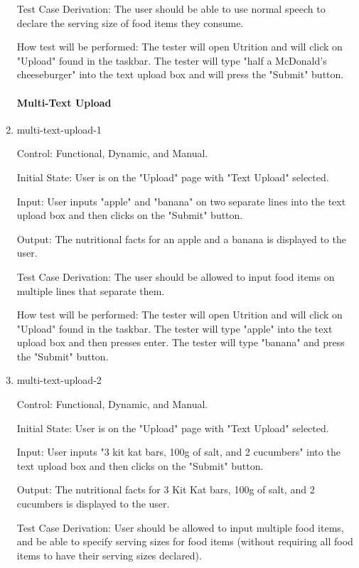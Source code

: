 \documentclass[12pt, titlepage]{article}
\begin{document}
\begin{enumerate}
	Test Case Derivation: The user should be able to use normal speech to declare the serving size of food items they consume.
	
	How test will be performed: The tester will open Utrition and will click on "Upload" found in the taskbar. The tester will type "half a McDonald's cheeseburger" into the text upload box and will press the "Submit" button.
	
	\paragraph{Multi-Text Upload}
	
	\item{multi-text-upload-1\\}
	
	Control: Functional, Dynamic, and Manual.
	
	Initial State: User is on the "Upload" page with "Text Upload" selected.
	
	Input: User inputs "apple" and "banana" on two separate lines into the text upload box and then clicks on the "Submit" button.
	
	Output: The nutritional facts for an apple and a banana is displayed to the user.
	
	Test Case Derivation: The user should be allowed to input food items on multiple lines that separate them.
	
	How test will be performed: The tester will open Utrition and will click on "Upload" found in the taskbar. The tester will type "apple" into the text upload box and then presses enter. The tester will type "banana" and press the "Submit" button.
	
	\item{multi-text-upload-2\\}
	
	Control: Functional, Dynamic, and Manual.
	
	Initial State: User is on the "Upload" page with "Text Upload" selected.
	
	Input: User inputs "3 kit kat bars, 100g of salt, and 2 cucumbers" into the text upload box and then clicks on the "Submit" button.
	
	Output: The nutritional facts for 3 Kit Kat bars, 100g of salt, and 2 cucumbers is displayed to the user.
	
	Test Case Derivation: User should be allowed to input multiple food items, and be able to specify serving sizes for food items (without requiring all food items to have their serving sizes declared).
	

\end{enumerate}
\end{document}
